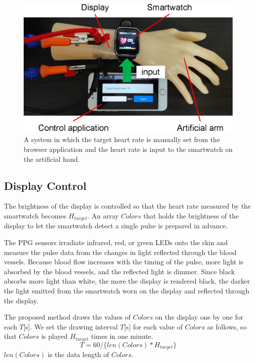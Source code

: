 \documentclass[sigchi,authordraft]{acmart}
\begin{document}
\begin{figure}[!t]
  \centering
  \includegraphics[width=0.75\linewidth]{figures/system.eps}
  \caption{A system in which the target heart rate is manually set from the browser application and the heart rate is input to the smartwatch on the artificial hand.}
  \label{fig:system}
\end{figure}


\subsection{Display Control}
\label{subsec:display_control}
The brightness of the display is controlled so that the heart rate measured by the smartwatch becomes $H_{target}$. An array $Colors$ that holds the brightness of the display to let the smartwatch detect a single pulse is prepared in advance.\par

The PPG sensors irradiate infrared, red, or green LEDs onto the skin and measure the pulse data from the changes in light reflected through the blood vessels. Because blood flow increases with the timing of the pulse, more light is absorbed by the blood vessels, and the reflected light is dimmer. Since black absorbs more light than white, the more the display is rendered black, the darker the light emitted from the smartwatch worn on the display and reflected through the display.\par

The proposed method draws the values of $Colors$ on the display one by one for each $T$[s]. We set the drawing interval $T$[s] for each value of $Colors$ as follows, so that $Colors$ is played $H_{target}$ times in one minute.
\begin{equation}
  \label{eqn:wait}
  T = 60 / \{len(Colors) * H_{target}\}
\end{equation}
$len(Colors)$ is the data length of $Colors$.
\end{document}
